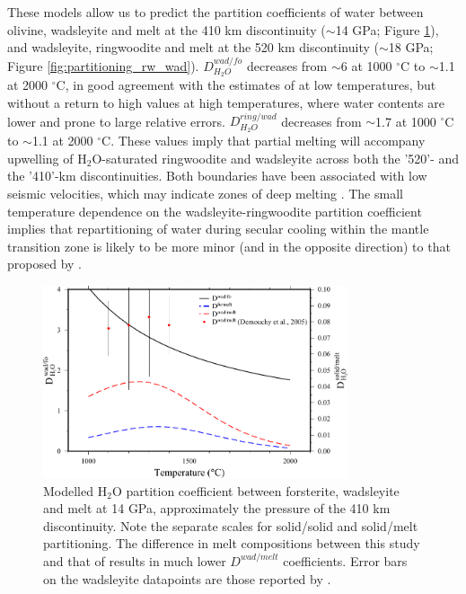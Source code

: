 \documentclass[review]{elsarticle}
\begin{document}
These models allow us to predict the partition coefficients of water between olivine, wadsleyite and melt at the 410 km discontinuity ($\sim$14 GPa; Figure \ref{fig:partitioning_wad_fo}), and wadsleyite, ringwoodite and melt at the 520 km discontinuity ($\sim$18 GPa; Figure \ref{fig:partitioning_rw_wad}). $D^{wad/fo}_{H_2O}$ decreases from $\sim$6 at 1000 $^{\circ}$C to $\sim$1.1 at 2000 $^{\circ}$C, in good agreement with the estimates of \cite{LSOK2011} at low temperatures, but without a return to high values at high temperatures, where water contents are lower and prone to large relative errors. $D^{ring/wad}_{H_2O}$ decreases from $\sim$1.7 at 1000 $^{\circ}$C to $\sim$1.1 at 2000 $^{\circ}$C. These values imply that partial melting will accompany upwelling of H$_2$O-saturated ringwoodite and wadsleyite across both the '520'- and the '410'-km discontinuities. Both boundaries have been associated with low seismic velocities, which may indicate zones of deep melting \citep[e.g.][]{JDH2010}. The small temperature dependence on the wadsleyite-ringwoodite partition coefficient implies that repartitioning of water during secular cooling within the mantle transition zone is likely to be more minor (and in the opposite direction) to that proposed by \cite{DDFK2005}. 

\begin{figure}[ht!]
  \centering
  \includegraphics[width=0.8\textwidth]{figures/wad_fo_partitioning_410}
  \caption{Modelled H$_2$O partition coefficient between forsterite, wadsleyite and melt at 14 GPa, approximately the pressure of the 410 km discontinuity. Note the separate scales for solid/solid and solid/melt partitioning. The difference in melt compositions between this study and that of \cite{DDFK2005} results in much lower $D^{wad/melt}$ coefficients. Error bars on the wadsleyite datapoints are those reported by \cite{DDFK2005}.}
  \label{fig:partitioning_wad_fo}
\end{figure}
\end{document}
